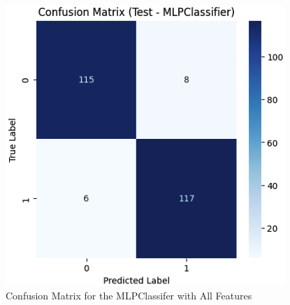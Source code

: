 \documentclass[conference]{IEEEtran}
\begin{document}
\begin{figure}[H]
    \centering
    \includegraphics[width=1\linewidth]{images/ConfusionMatrixNNAllFeatures.png}
    \caption{Confusion Matrix for the MLPClassifer with All Features}
    \label{fig:NN-Confusion-AllFeatures}
\end{figure}
\end{document}
